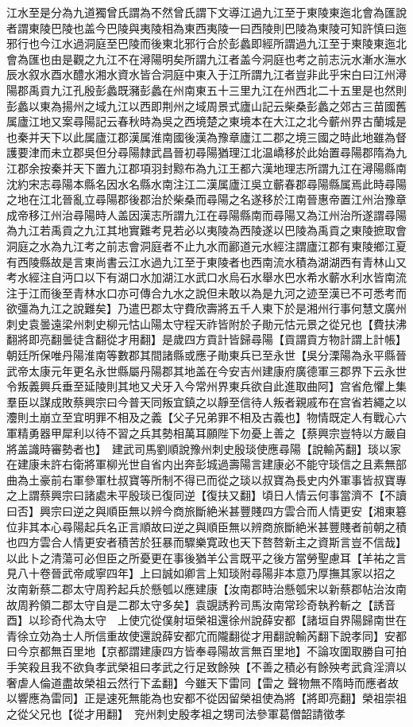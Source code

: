 江水至是分為九道獨曾氏謂為不然曾氏謂下文導江過九江至于東陵東迤北會為匯說者謂東陵巴陵也盖今巴陵與夷陵相為東西夷陵一曰西陵則巴陵為東陵可知許慎曰迤邪行也今江水過洞庭至巴陵而後東北邪行合於彭蠡即經所謂過九江至于東陵東迤北會為匯也由是觀之九江不在潯陽明矣所謂九江者盖今洞庭也考之前志沅水漸水潕水辰水叙水酉水醴水湘水資水皆合洞庭中東入于江所謂九江者豈非此乎宋白曰江州潯陽郡禹貢九江孔殷彭蠡既瀦彭蠡在州南東五十三里九江在州西北二十五里是也然則彭蠡以東為揚州之域九江以西即荆州之域周景式廬山記云柴桑彭蠡之郊古三苗國舊属廬江地又案尋陽記云春秋時為吳之西境楚之東境本在大江之北今蘄州界古蘭城是也秦并天下以此属廬江郡漢属淮南國後漢為豫章廬江二郡之境三國之時此地雖為督護要津而未立郡吳但分尋陽隸武昌晉初尋陽猶理江北温嶠移於此始置尋陽郡隋為九江郡余按秦并天下置九江郡項羽封黥布為九江王都六漢地理志所謂九江在潯陽縣南沈約宋志尋陽本縣名因水名縣水南注江二漢属廬江吳立蘄春郡尋陽縣属焉此時尋陽之地在江北晉亂立尋陽郡後郡治於柴桑而尋陽之名遂移於江南晉惠帝置江州治豫章成帝移江州治尋陽時人盖因漢志所謂九江在尋陽縣南而尋陽又為江州治所遂謂尋陽為九江若禹貢之九江其地實難考見若必以夷陵為西陵遂以巴陵為禹貢之東陵摭取會洞庭之水為九江考之前志會洞庭者不止九水而酈道元水經注謂廬江郡有東陵鄉江夏有西陵縣故是言東尚書云江水過九江至于東陵者也西南流水積為湖湖西有青林山又考水經注自沔口以下有湖口水加湖江水武口水烏石水舉水巴水希水蘄水利水皆南流注于江而後至青林水口亦可傳合九水之說但未敢以為是九河之迹至漢已不可悉考而欲彊為九江之說難矣】乃遣巴郡太守費欣壽將五千人東下於是湘州行事何慧文廣州刺史袁曇遠梁州刺史柳元怙山陽太守程天祚皆附於子勛元怙元景之從兄也【費扶沸翻將即亮翻曇徒含翻從才用翻】是歲四方貢計皆歸尋陽【貢謂貢方物計謂上計帳】朝廷所保唯丹陽淮南等數郡其間諸縣或應子勛東兵已至永世【吳分溧陽為永平縣晉武帝太康元年更名永世縣屬丹陽郡其地盖在今安吉州建康府廣德軍三郡界下云永世令叛義興兵垂至延陵則其地又犬牙入今常州界東兵欲自此進取曲阿】宫省危懼上集羣臣以謀成敗蔡興宗曰今普天同叛宜鎮之以靜至信待人叛者親戚布在宫省若繩之以灋則土崩立至宜明罪不相及之義【父子兄弟罪不相及古義也】物情既定人有戰心六軍精勇器甲犀利以待不習之兵其勢相萬耳願陛下勿憂上善之【蔡興宗豈特以方嚴自將盖識時審勢者也】　建武司馬劉順說豫州刺史殷琰使應尋陽【說輸芮翻】琰以家在建康未許右衛將軍柳光世自省内出奔彭城過壽陽言建康必不能守琰信之且素無部曲為土豪前右軍參軍杜叔寶等所制不得已而從之琰以叔寶為長史内外軍事皆叔寶專之上謂蔡興宗曰諸處未平殷琰已復同逆【復扶又翻】頃日人情云何事當濟不【不讀曰否】興宗曰逆之與順臣無以辨今商旅斷絶米甚豐賤四方雲合而人情更安【湘東簒位非其本心尋陽起兵名正言順故曰逆之與順臣無以辨商旅斷絶米甚豐賤者前朝之積也四方雲合人情更安者積苦於狂暴而驟樂寛政也天下嗸嗸新主之資斯言豈不信哉】以此卜之清蕩可必但臣之所憂更在事後猶羊公言既平之後方當勞聖慮耳【羊祐之言見八十卷晉武帝咸寧四年】上曰誠如卿言上知琰附尋陽非本意乃厚撫其家以招之　汝南新蔡二郡太守周矜起兵於懸瓠以應建康【汝南郡時治懸瓠宋以新蔡郡帖治汝南故周矜領二郡太守自是二郡太守多矣】袁覬誘矜司馬汝南常珍奇執矜斬之【誘音酉】以珍奇代為太守　上使宂從僕射垣榮祖還徐州說薛安都【諸垣自界陽歸南世在青徐立効為士人所信重故使還說薛安都宂而隴翻從才用翻說輸芮翻下說孝同】安都曰今京都無百里地【京都謂建康四方皆奉尋陽故言無百里地】不論攻圍取勝自可拍手笑殺且我不欲負孝武榮祖曰孝武之行足致餘殃【不善之積必有餘殃考武貪淫濟以奢虐人倫道盡故榮祖云然行下孟翻】今雖天下雷同【雷之聲物無不隋時而應者故以響應為雷同】正是速死無能為也安都不從因留榮祖使為將【將即亮翻】榮祖崇祖之從父兄也【從才用翻】　兖州刺史殷孝祖之甥司法參軍葛僧韶請徵孝